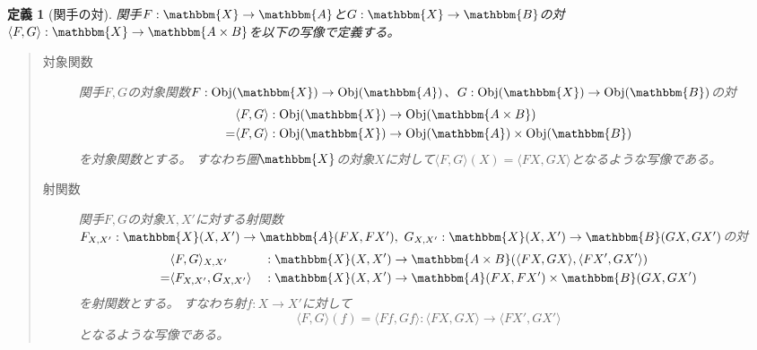 \documentclass[dvipdfmx]{jsarticle}
\newcommand{\cat}[1]{\mathbbm{#1}}
\newcommand{\arrow}{\rightarrow}
\newcommand{\functor}[3]{#1:\cat{#2}\arrow \cat{#3}}
\newcommand{\tuple}[1]{\langle #1\rangle}
\newcommand{\obj}[1]{\mathrm{Obj}(\cat{#1})}
\newcommand{\mor}[3]{#1:#2\arrow #3}
\newcommand{\arset}[3]{\cat{#1}(#2,#3)}
\newtheorem{define}{定義}[section]
\numberwithin{proof}{subsection}
\numberwithin{prop}{subsection}
\numberwithin{define}{subsection}
\begin{document}
	\begin{define}[関手の対]
		関手$\functor{F}{X}{A}$と$\functor{G}{X}{B}$の対$\functor{\tuple{F,G}}{X}{A\times B}$を以下の写像で定義する。
		\begin{quote}
			\begin{description}
				\item[対象関数] 関手$F,G$の対象関数$\mor{F}{\obj{X}}{\obj{A}}$、$\mor{G}{\obj{X}}{\obj{B}}$の対
				\begin{align*}
					&\mor{\tuple{F,G}}{\obj{X}}{\obj{A\times B}}\\
					=&\mor{\tuple{F,G}}{\obj{X}}{\obj{A}\times \obj{B}}
				\end{align*}
				を対象関数とする。
				すなわち圏$\cat{X}$の対象$X$に対して$\tuple{F,G}(X)=\tuple{FX,GX}$となるような写像である。
				\item[射関数]
				関手$F,G$の対象$X,X'$に対する射関数$\mor{F_{X,X'}}{\arset{X}{X}{X'}}{\arset{A}{FX}{FX'}},\ \mor{G_{X,X'}}{\arset{X}{X}{X'}}{\arset{B}{GX}{GX'}}$の対
				\begin{align*}
					&\mor{\tuple{F,G}_{X,X'}&&}{\arset{X}{X}{X'}}{\arset{A\times B}{\tuple{FX,GX}}{\tuple{FX',GX'}}}\\
					=&	\mor{\tuple{F_{X,X'},G_{X,X'}}&&}{\arset{X}{X}{X'}}{\arset{A}{FX}{FX'}\times\arset{B}{GX}{GX'}}
				\end{align*}
				を射関数とする。
				すなわち射$\mor{f}{X}{X'}$に対して\[\mor{\tuple{F,G}(f)=\tuple{Ff,Gf}}{\tuple{FX,GX}}{\tuple{FX',GX'}}\]となるような写像である。


\end{description}
\end{quote}
\end{define}
\end{document}

